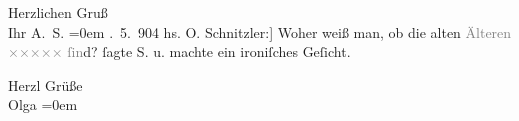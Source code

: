            \vspace{1em}
\pstart
           {\pb}Herzlichen Gruß{\\[\baselineskip]}Ihr \spacefill\mbox{A. S.}\pend
           \leftskip=0em{}
. 5. 904\pend
           \vspace{1em}
\pstart
           \noindent{}{[}hs. O. Schnitzler:{]} Woher weiß man, ob die alten
                  \textcolor{gray}{Älteren}{ }\textcolor{gray}{×}\-\textcolor{gray}{×}\-\textcolor{gray}{×}\-\textcolor{gray}{×}\-\textcolor{gray}{×}{ }\textcolor{gray}{ſin}d?{ }ſagte S. u. machte ein ironiſches Geſicht.\pend
           
\pstart
           Herzl Grüße{\\[\baselineskip]}\spacefill\mbox{Olga}\pend
           \leftskip=0em{}\endnumbering{}
\begin{anhang}
\end{anhang}\newcommand{\dateiname}{L04358}\newcommand{\titel}{Arthur und Olga Schnitzler an Gustav Schwarzkopf, 4. 5. 1904}\newcommand{\editorInnen}{Herausgegeben von Jahnke, SelmaMüller, Martin Anton}
